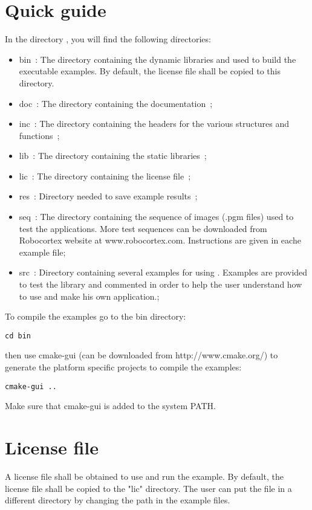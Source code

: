 \section{Quick guide}
\label{sec:install}

\noindent In the directory \roxdir{}, you will find the following directories:

\begin{itemize}
  \item bin~: The directory containing the dynamic libraries and used to build the executable examples. By default, the license file shall be copied to this directory.
  \item doc~: The directory containing the documentation~;
  \item inc~: The directory containing the headers for the various structures and functions~;
  \item lib~: The directory containing the static libraries~;
  \item lic~: The directory containing the license file~;
  \item res~: Directory needed to save example results~;
  \item seq~: The directory containing the sequence of images (.pgm files) used to test the applications. More test sequences can be downloaded from Robocortex website at www.robocortex.com. Instructions are given in eache example file;
  \item src~: Directory containing several examples for using \rox{}. Examples are provided to test the library and commented in order to
help the user understand how to use and make his own application.;
\end{itemize}

\noindent To compile the examples go to the bin directory:
\begin{lstlisting}
cd bin
\end{lstlisting}
then use cmake-gui (can be downloaded from http://www.cmake.org/) to generate the platform specific projects to compile the examples: 
\begin{lstlisting}
cmake-gui ..
\end{lstlisting}
Make sure that cmake-gui is added to the system PATH. 

\section{License file}
\label{sec:license_file}

A license file shall be obtained to use \rox{} and run the example. By default, the license file shall be copied to the "lic" directory. The user can put the file in a different directory by changing the path in the example files.

